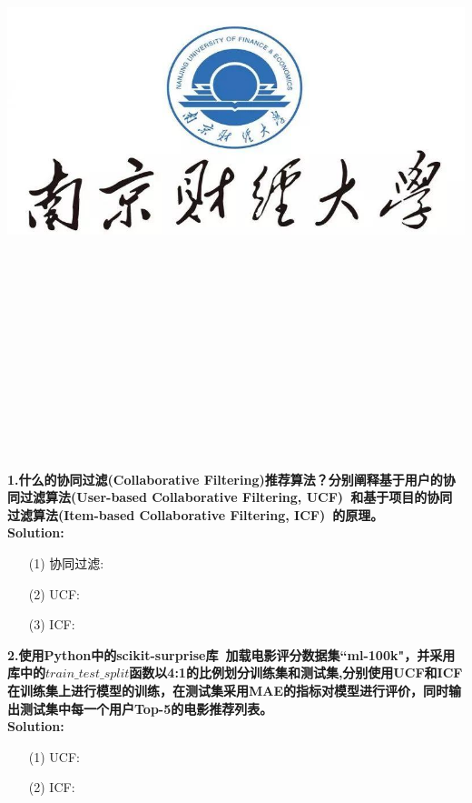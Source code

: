 \documentclass{article}
\title{
	\includegraphics[scale = 0.45]{images/title/ucas-logo1.png}\\
    \vspace{1in}
    \textmd{\textbf{\hmwkClass\ \hmwkTitle}}\\
    \textmd{\textbf{\hmwkSubTitle}}\\
    \normalsize\vspace{0.1in}\small{\hmwkCompleteTime }\\
    \vspace{0.1in}\large{\textit{\hmwkClassInstructor\ }}\\
    \vspace{3in}
}
\author{\hmwkAuthorName \\ 
	\hmwkAuthorStuID}
\date{}
\begin{document}
\maketitle


%


\pagebreak

\begin{homeworkProblem}
 \noindent\textbf{1.什么的协同过滤(Collaborative Filtering)推荐算法？分别阐释基于用户的协同过滤算法(User-based Collaborative Filtering, UCF)~\cite{G_UCF}和基于项目的协同过滤算法(Item-based Collaborative Filtering, ICF)~\cite{linden2003amazon}的原理。}\\
\textbf{Solution:}
{\color{blue}
\begin{itemize}
	\item [(1)]协同过滤:
	\item [(2)]UCF:
	\item [(3)]ICF:
\end{itemize}

}
\end{homeworkProblem}

\pagebreak


\begin{homeworkProblem}
 \noindent\textbf{2.使用Python中的scikit-surprise库~\cite{Hug2020}加载电影评分数据集``ml-100k"，并采用库中的$train\_test\_split$函数以4:1的比例划分训练集和测试集,分别使用UCF和ICF在训练集上进行模型的训练，在测试集采用MAE的指标对模型进行评价，同时输出测试集中每一个用户Top-5的电影推荐列表。}\\
\textbf{Solution:}
{\color{blue} 
\begin{itemize}
	\item [(1)]UCF:
	\item [(2)]ICF:
\end{itemize}
}


\end{homeworkProblem}


\end{document}

